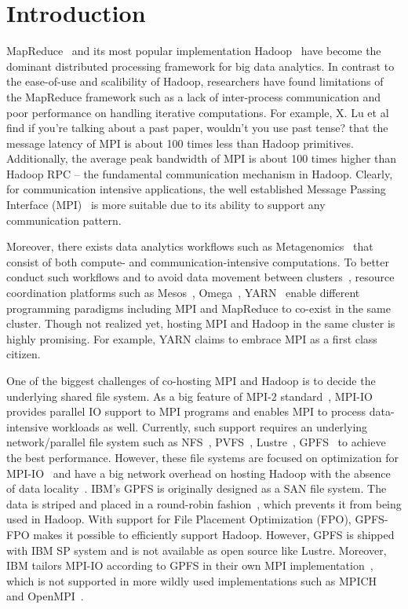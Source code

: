 \section{Introduction}
MapReduce~\cite{mr} and its most popular implementation Hadoop~\cite{hadoop}
have become the dominant distributed processing framework for big data
analytics. In contrast to the ease-of-use and scalibility of Hadoop, researchers
have found limitations of the MapReduce framework such as a lack of inter-process
communication and poor performance on handling iterative computations. For
example, X. Lu et al~\cite{xlu} find{\color{red} if you're talking about a past paper,
wouldn't you use past tense?} that the message latency of MPI is about
100 times less than Hadoop primitives. Additionally, the average peak bandwidth of MPI is
about 100 times higher than Hadoop RPC -- the fundamental communication
mechanism in Hadoop. Clearly, for communication intensive applications, the well established Message Passing
Interface (MPI)~\cite{mpi2012} is more suitable due to its ability to support
any communication pattern.
 
Moreover, there exists data analytics workflows such as
Metagenomics~\cite{meta} that consist of both compute- and communication-intensive
computations. To better conduct such workflows and to avoid data
movement between clusters~\cite{catch}, resource coordination platforms such as
Mesos~\cite{mesos}, Omega~\cite{omega}, YARN~\cite{yarn2013} enable different
programming paradigms including MPI and MapReduce to co-exist in the same
cluster. Though not realized yet, hosting MPI and Hadoop in the same cluster is
highly promising. For example, YARN claims to embrace MPI as a first class citizen.

One of the biggest challenges of co-hosting MPI and Hadoop is to decide the
underlying shared file system. As a big feature of MPI-2 standard~\cite{mpi2012},
MPI-IO provides parallel IO support to MPI programs and enables MPI to process
data-intensive workloads as well. Currently, such support requires an underlying
network/parallel file system such as NFS~\cite{nfs1}, PVFS~\cite{pvfs},
Lustre~\cite{lustre}, GPFS~\cite{gpfs} to achieve the best performance. However,
these file systems are focused on optimization for MPI-IO~\cite{mpipvfs,
mpilustre1, mpigpfs} and have a big network overhead on hosting Hadoop with the
absence of data locality~\cite{hadooplustre}. IBM's GPFS is originally designed
as a SAN file system. The data is striped and placed in a round-robin
fashion~\cite{gpfs}, which prevents it from being used in Hadoop. With support
for File Placement Optimization (FPO), GPFS-FPO makes it possible to efficiently
support Hadoop.  However, GPFS is shipped with IBM SP system and is not
available as open source like Lustre. Moreover, IBM tailors MPI-IO according to
GPFS in their own MPI implementation~\cite{mpigpfs}, which is not supported in
more wildly used implementations such as MPICH~\cite{mpich} and
OpenMPI~\cite{openmpi}.

